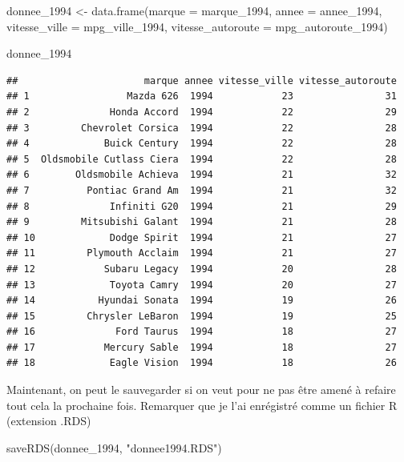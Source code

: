 \documentclass[
]{article}
\newenvironment{Shaded}{\begin{snugshade}}{\end{snugshade}}
\newcommand{\AttributeTok}[1]{\textcolor[rgb]{0.77,0.63,0.00}{#1}}
\newcommand{\FunctionTok}[1]{\textcolor[rgb]{0.00,0.00,0.00}{#1}}
\newcommand{\NormalTok}[1]{#1}
\newcommand{\OtherTok}[1]{\textcolor[rgb]{0.56,0.35,0.01}{#1}}
\newcommand{\StringTok}[1]{\textcolor[rgb]{0.31,0.60,0.02}{#1}}
\begin{document}
\begin{Shaded}
\begin{Highlighting}[]
\NormalTok{donnee\_1994 }\OtherTok{\textless{}{-}} \FunctionTok{data.frame}\NormalTok{(}\AttributeTok{marque =}\NormalTok{ marque\_1994, }\AttributeTok{annee =}\NormalTok{ annee\_1994, }\AttributeTok{vitesse\_ville =}\NormalTok{ mpg\_ville\_1994, }\AttributeTok{vitesse\_autoroute =}\NormalTok{ mpg\_autoroute\_1994)}

\NormalTok{donnee\_1994}
\end{Highlighting}
\end{Shaded}

\begin{verbatim}
##                      marque annee vitesse_ville vitesse_autoroute
## 1                 Mazda 626  1994            23                31
## 2              Honda Accord  1994            22                29
## 3         Chevrolet Corsica  1994            22                28
## 4             Buick Century  1994            22                28
## 5  Oldsmobile Cutlass Ciera  1994            22                28
## 6        Oldsmobile Achieva  1994            21                32
## 7          Pontiac Grand Am  1994            21                32
## 8              Infiniti G20  1994            21                29
## 9         Mitsubishi Galant  1994            21                28
## 10             Dodge Spirit  1994            21                27
## 11         Plymouth Acclaim  1994            21                27
## 12            Subaru Legacy  1994            20                28
## 13             Toyota Camry  1994            20                27
## 14           Hyundai Sonata  1994            19                26
## 15         Chrysler LeBaron  1994            19                25
## 16              Ford Taurus  1994            18                27
## 17            Mercury Sable  1994            18                27
## 18             Eagle Vision  1994            18                26
\end{verbatim}

Maintenant, on peut le sauvegarder si on veut pour ne pas être amené à
refaire tout cela la prochaine fois. Remarquer que je l'ai enrégistré
comme un fichier R (extension .RDS)

\begin{Shaded}
\begin{Highlighting}[]
\FunctionTok{saveRDS}\NormalTok{(donnee\_1994, }\StringTok{"donnee1994.RDS"}\NormalTok{)}
\end{Highlighting}
\end{Shaded}
\end{document}
